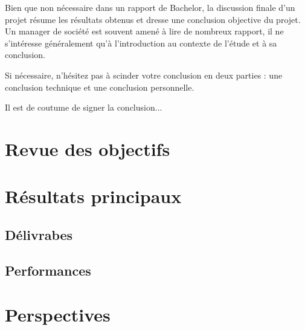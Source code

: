 Bien que non nécessaire dans un rapport de Bachelor, la discussion finale d'un projet résume les résultats obtenus et dresse une conclusion objective du projet. Un manager de société est souvent amené à lire de nombreux rapport, il ne s'intéresse généralement qu'à l'introduction au contexte de l'étude et à sa conclusion.

Si nécessaire, n'hésitez pas à scinder votre conclusion en deux parties : une conclusion technique et une conclusion personnelle.

Il est de coutume de signer la conclusion...

\section{Revue des objectifs}
\section{Résultats principaux}
\subsection{Délivrabes}
\subsection{Performances}
\section{Perspectives}

\vfil
\hspace{8cm}\makeatletter\@author\makeatother\par
\hspace{8cm}\begin{minipage}{5cm}
    \printsignature
\end{minipage}
